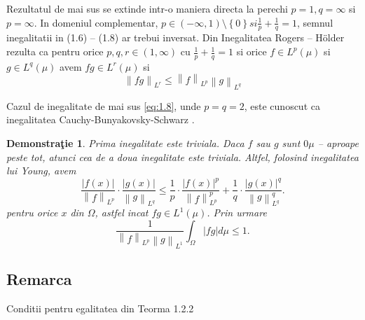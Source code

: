 \documentclass[a4paper,12pt,oneside]{report}
\newtheorem{demonstration}{Demonstra\c tie}
\begin{document}
	Rezultatul de mai sus se extinde intr-o maniera directa la perechi \(p = 1, q = \infty\) si \(p = \infty\). In domeniul complementar, \(p\in \left ( -\infty , 1 \right )\setminus \left \{ 0 \right \} si \frac{1}{p} + \frac{1}{q} = 1\), semnul inegalitatii in (1.6) – (1.8) ar trebui inversat. 
	Din Inegalitatea Rogers – Hölder rezulta ca pentru orice \(p, q, r \in \left ( 1 , \infty  \right )\) cu \(\frac{1}{p} + \frac{1}{q} = 1\) si orice \(f\in L^{p}\left ( \mu  \right )\) si \(g\in L^{q}\left ( \mu  \right )\) avem \(fg\in L^{r}\left ( \mu  \right )\) si 
\begin{displaymath}
  \left \| fg \right \|_{L^{r}}\leq \left \| f \right \|_{L^{p}}\left \| g \right \|_{L^{q}} \label{eq:1.9} \tag{1.9}
\end{displaymath}


Cazul de inegalitate de mai sus \ref{eq:1.8}, unde \(p = q = 2\), este cunoscut ca inegalitatea Cauchy-Bunyakovsky-Schwarz . 

\begin{demonstration}
Prima inegalitate este triviala. Daca \(f\) sau \(g\) sunt \(0 \mu\) – aproape peste tot, atunci cea de a doua inegalitate este triviala. Altfel, folosind inegalitatea lui Young, avem 
\begin{displaymath}
  \frac{\left | f\left ( x \right ) \right |}{\left \| f \right \|_{L^{p}}} \cdot \frac{\left | g\left ( x \right ) \right |}{\left \| g \right \|_{L^{q}}}\leq \frac{1}{p}\cdot \frac{\left | f\left ( x \right ) \right |^{p}}{\left \| f \right \|^{p}_{L^{p}}} + \frac{1}{q}\cdot \frac{\left | g\left ( x \right ) \right |^{q}}{\left \| g \right \|^{q}_{L^{q}}}.
\end{displaymath}
 pentru orice \(x\) din \(\Omega\), astfel incat \(fg \in L^{1}\left ( \mu  \right )\). Prin urmare 
\begin{displaymath}
  \frac{1}{\left \| f \right \|_{L^{p}}\left \| g \right \|_{L^{1}}}\int_{\Omega }\left | fg \right |d\mu \leq 1.
\end{displaymath}
\end{demonstration}

\subsection{Remarca}

Conditii pentru egalitatea din Teorma 1.2.2
\end{document}
